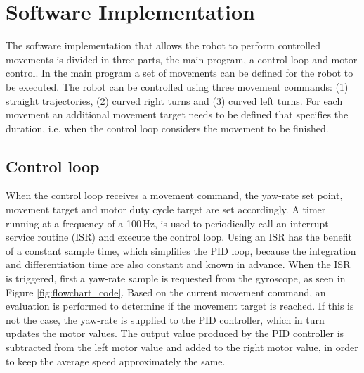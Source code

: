 


\section{Software Implementation}
\label{sec:dai_software_implementation}

The software implementation that allows the robot to perform controlled movements is divided in three parts, the main program, a control loop and motor control.
In the main program a set of movements can be defined for the robot to be executed.
The robot can be controlled using three movement commands: (1) straight trajectories, (2) curved right turns and (3) curved left turns.
For each movement an additional movement target needs to be defined that specifies the duration, i.e. when the control loop considers the movement to be finished.

\subsection{Control loop}

When the control loop receives a movement command, the yaw-rate set point, movement target and motor duty cycle target are set accordingly.
A timer running at a frequency of a 100\,Hz, is used to periodically call an interrupt service routine (ISR) and execute the control loop.
Using an ISR has the benefit of a constant sample time, which simplifies the PID loop, because the integration and differentiation time are also constant and known in advance.
When the ISR is triggered, first a yaw-rate sample is requested from the gyroscope, as seen in Figure \ref{fig:flowchart_code}.
Based on the current movement command, an evaluation is performed to determine if the movement target is reached.
If this is not the case, the yaw-rate is supplied to the PID controller, which in turn updates the motor values.
The output value produced by the PID controller is subtracted from the left motor value and added to the right motor value, in order to keep the average speed approximately the same.

